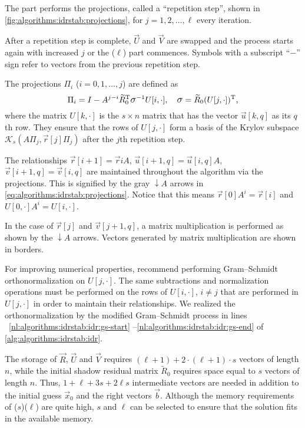 The  part performs the projections, called a ``repetition
step'', shown in \cref{fig:algorithms:idrstab:projections}, for
$j = 1, 2, \ldots, \ell$ every iteration.

After a repetition step is complete, $\vec{U}$ and $\vec{V}$ are
swapped and the process starts again with increased $j$ or the
($\ell$) part commences. Symbols with a subscript
``$-$'' sign refer to vectors from the previous repetition step.

The projections $\Pi_i$ ($i = 0, 1, \ldots, j$) are defined as
\begin{equation}
  \label{eq:algorithms:idrstab:projection}
  \Pi_i = I - A^{j - i} \widetilde{R}_0^\T \largesigma^{-1} U[i, \cdot],
  \quad \largesigma = \widetilde{R}_0 (U[j, \cdot])^\T \text,
\end{equation}
where the matrix $U[k, \cdot]$ is the $s \times n$ matrix that has the
vector $\vec{u}[k, q]$ as its $q$th row. They ensure that the rows of
$U[j, \cdot]$ form a basis of the Krylov subspace
$\mathcal{K}_s(A \Pi_j, \vec{r}[j] \Pi_j)$ after the $j$th repetition
step.

The relationships $\vec{r}[i + 1] = \vec{r}{i} A$,
$\vec{u}[i + 1, q] = \vec{u}[i, q] A$,
$\vec{v}[i + 1, q] = \vec{v}[i, q]$ are maintained throughout the
algorithm via the projections. This is signified by the gray
{\color{black!50}$\downarrow A$} arrows in
\cref{eq:algorithms:idrstab:projections}. Notice that this means
$\vec{r}[0] A^i = \vec{r}[i]$ and $U[0, \cdot] A^i = U[i, \cdot]$.

In the case of $\vec{r}[j]$ and $\vec{v}[j + 1, q]$, a matrix
multiplication is performed as shown by the $\downarrow A$
arrows. Vectors generated by matrix multiplication are shown in
borders.

For improving numerical properties, \citet{sleijpen2010exploiting}
recommend performing Gram--Schmidt orthonormalization on $U[j, \cdot]$.
The same subtractions and normalization operations must be performed
on the rows of $U[i, \cdot]$, $i \ne j$ that are performed in
$U[j, \cdot]$ in order to maintain their relationships. We realized
the orthonormalization by the modified Gram--Schmidt process in lines%
~\ref{nl:algorithms:idrstab:idr:gs-start}%
--\ref{nl:algorithms:idrstab:idr:gs-end} of
\cref{alg:algorithms:idrstab:idr}.

The storage of $\vec{R}$, $\vec{U}$ and $\vec{V}$ requires
$(\ell + 1) + 2 \cdot (\ell + 1) \cdot s$ vectors of length $n$, while
the initial shadow residual matrix $\widetilde{R}_0$ requires space
equal to $s$ vectors of length $n$. Thus, $1 + \ell + 3s + 2\ell s$
intermediate vectors are needed in addition to the initial guess
$\vec{x}_0$ and the right vectors $\vec{b}$. Although the memory
requirements of ($s$)($\ell$) are quite high,
$s$ and $\ell$ can be selected to ensure that the solution fits in the
available memory.

